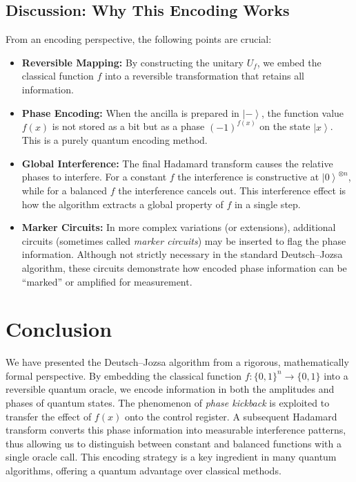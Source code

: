 \documentclass[11pt,oneside]{book}
\theoremstyle{remark}
\renewcommand{\ket}[1]{\left|#1\right\rangle}      %
\begin{document}
	\section{Discussion: Why This Encoding Works}
	From an encoding perspective, the following points are crucial:
	\begin{itemize}[leftmargin=*, labelsep=5mm]
		\item \textbf{Reversible Mapping:}  
		By constructing the unitary \( U_f \), we embed the classical function \( f \) into a reversible transformation that retains all information.
		\item \textbf{Phase Encoding:}  
		When the ancilla is prepared in \( \ket{-} \), the function value \( f(x) \) is not stored as a bit but as a phase \( (-1)^{f(x)} \) on the state \( \ket{x} \). This is a purely quantum encoding method.
		\item \textbf{Global Interference:}  
		The final Hadamard transform causes the relative phases to interfere. For a constant \( f \) the interference is constructive at \( \ket{0}^{\otimes n} \), while for a balanced \( f \) the interference cancels out. This interference effect is how the algorithm extracts a global property of \( f \) in a single step.
		\item \textbf{Marker Circuits:}  
		In more complex variations (or extensions), additional circuits (sometimes called \emph{marker circuits}) may be inserted to flag the phase information. Although not strictly necessary in the standard Deutsch--Jozsa algorithm, these circuits demonstrate how encoded phase information can be “marked” or amplified for measurement.
	\end{itemize}
	
	\chapter{Conclusion}
	
	We have presented the Deutsch--Jozsa algorithm from a rigorous, mathematically formal perspective. By embedding the classical function \( f:\{0,1\}^n\to\{0,1\} \) into a reversible quantum oracle, we encode information in both the amplitudes and phases of quantum states. The phenomenon of \emph{phase kickback} is exploited to transfer the effect of \( f(x) \) onto the control register. A subsequent Hadamard transform converts this phase information into measurable interference patterns, thus allowing us to distinguish between constant and balanced functions with a single oracle call. This encoding strategy is a key ingredient in many quantum algorithms, offering a quantum advantage over classical methods.
	
\end{document}

